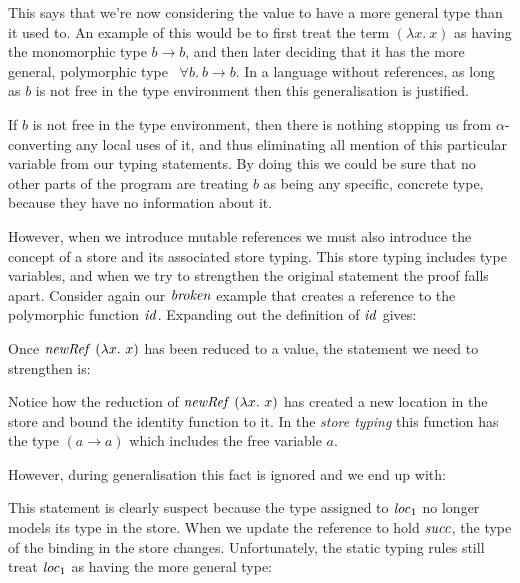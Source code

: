 
This says that we're now considering the value to have a more general type than it used to. An example of this would be to first treat the term $(\lambda x. \ x)$ as having the monomorphic type $b \to b$, and then later deciding that it has the more general, polymorphic type \ $\forall b. \ b \to b$. In a language without references, as long as $b$ is not free in the type environment then this generalisation is justified. 

If $b$ is not free in the type environment, then there is nothing stopping us from $\alpha$-converting any local uses of it, and thus eliminating all mention of this particular variable from our typing statements. By doing this we could be sure that no other parts of the program are treating $b$ as being any specific, concrete type, because they have no information about it.

However, when we introduce mutable references we must also introduce the concept of a store and its associated store typing. This store typing includes type variables, and when we try to strengthen the original statement the proof falls apart. Consider again our $\operatorname{\mathit{broken}}$ example that creates a reference to the polymorphic function $\operatorname{\mathit{id}}$. Expanding out the definition of $\operatorname{\mathit{id}}$ gives:


Once $\inewRef \ (\lambda x. \ x)$ has been reduced to a value, the statement we need to strengthen is:


Notice how the reduction of $\inewRef \ (\lambda x. \ x)$ has created a new location in the store and bound the identity function to it. In the \emph{store typing} this function has the type $(a \rightarrow a)$ which includes the free variable $a$. 

However, during generalisation this fact is ignored and we end up with:


This statement is clearly suspect because the type assigned to $\operatorname{\mathit{loc}}_1$ no longer models its type in the store. When we update the reference to hold $\operatorname{\mathit{succ}}$, the type of the binding in the store changes. Unfortunately, the static typing rules still treat $\operatorname{\mathit{loc}}_1$ as having the more general type:

